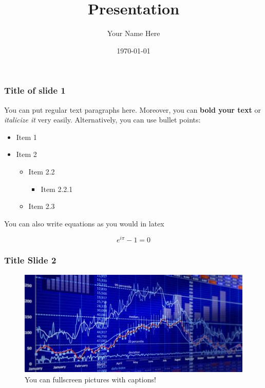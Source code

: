 \documentclass{beamer}
\title{Presentation}
\date{\today}
\author{Your Name Here}
\begin{document}
\frame{\titlepage}

\begin{frame}
    \frametitle{Title of slide 1}

You can put regular text paragraphs here. Moreover, you can \textbf{bold your text} or \emph{italicize it} very
easily. Alternatively, you can use bullet points:


\begin{itemize}
\item Item 1
\item Item 2

\begin{itemize}
\item Item 2.2

\begin{itemize}
\item Item 2.2.1

\end{itemize}
\item Item 2.3

\end{itemize}

\end{itemize}


You can also write equations as you would in latex

$$
e^{i \pi} - 1 = 0
$$


\end{frame}


\begin{frame}
    \frametitle{Title Slide 2}


    \begin{figure}
        \centering
        \includegraphics[width=0.9\paperwidth,height=0.7\paperheight,keepaspectratio]{./figs/stock_image.jpg}
        \caption{You can fullscreen pictures with captions!}
    \end{figure}
\end{frame}
\end{document}
